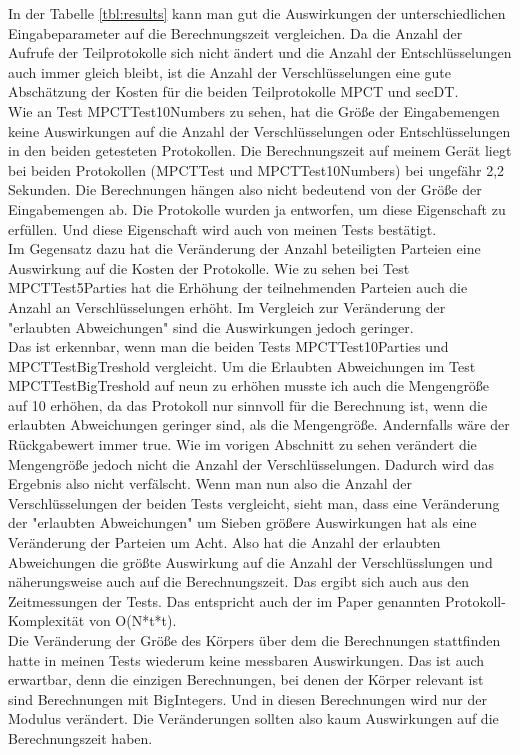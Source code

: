 In der Tabelle \ref{tbl:results} kann man gut die Auswirkungen der unterschiedlichen Eingabeparameter auf die Berechnungszeit vergleichen. Da die Anzahl der Aufrufe der Teilprotokolle sich nicht ändert und die Anzahl der Entschlüsselungen auch immer gleich bleibt, ist die Anzahl der Verschlüsselungen eine gute Abschätzung der Kosten für die beiden Teilprotokolle MPCT und secDT.\\
Wie an Test MPCTTest10Numbers zu sehen, hat die Größe der Eingabemengen keine Auswirkungen auf die Anzahl der Verschlüsselungen oder Entschlüsselungen in den beiden getesteten Protokollen. Die Berechnungszeit auf meinem Gerät liegt bei beiden Protokollen (MPCTTest und MPCTTest10Numbers) bei ungefähr 2,2 Sekunden. Die Berechnungen hängen also nicht bedeutend von der Größe der Eingabemengen ab. Die Protokolle wurden ja entworfen, um diese Eigenschaft zu erfüllen. \cite{Doettling2021} Und diese Eigenschaft wird auch von meinen Tests bestätigt.\\
Im Gegensatz dazu hat die Veränderung der Anzahl beteiligten Parteien eine Auswirkung auf die Kosten der Protokolle. Wie zu sehen bei Test MPCTTest5Parties hat die Erhöhung der teilnehmenden Parteien auch die Anzahl an Verschlüsselungen erhöht.
Im Vergleich zur Veränderung der "erlaubten Abweichungen" sind die Auswirkungen jedoch geringer.\\
Das ist erkennbar, wenn man die beiden Tests MPCTTest10Parties und MPCTTestBigTreshold vergleicht. Um die Erlaubten Abweichungen im Test MPCTTestBigTreshold auf neun zu erhöhen musste ich auch die Mengengröße auf 10 erhöhen, da das Protokoll nur sinnvoll für die Berechnung ist, wenn die erlaubten Abweichungen geringer sind, als die Mengengröße. Andernfalls wäre der Rückgabewert immer true. Wie im vorigen Abschnitt zu sehen verändert die Mengengröße jedoch nicht die Anzahl der Verschlüsselungen. Dadurch wird das Ergebnis also nicht verfälscht.
Wenn man nun also die Anzahl der Verschlüsselungen der beiden Tests vergleicht, sieht man, dass eine Veränderung der "erlaubten Abweichungen" um Sieben größere Auswirkungen hat als eine Veränderung der Parteien um Acht. Also hat die Anzahl der erlaubten Abweichungen die größte Auswirkung auf die Anzahl der Verschlüsslungen und näherungsweise auch auf die Berechnungszeit. Das ergibt sich auch aus den Zeitmessungen der Tests. Das entspricht auch der im Paper \cite{Doettling2021} genannten Protokoll-Komplexität von O(N*t*t).\\
Die Veränderung der Größe des Körpers über dem die Berechnungen stattfinden hatte 
in meinen Tests wiederum keine messbaren Auswirkungen. Das ist auch erwartbar, denn die einzigen Berechnungen, bei denen der Körper relevant ist sind Berechnungen mit BigIntegers. Und in diesen Berechnungen wird nur der Modulus verändert. Die Veränderungen sollten also kaum Auswirkungen auf die Berechnungszeit haben.\\


